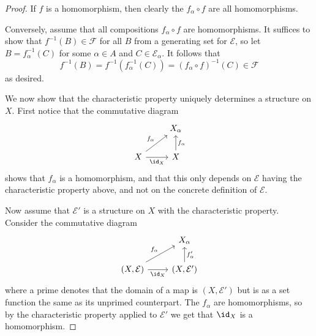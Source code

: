 \documentclass[article, a4paper, 11pt, oneside]{memoir}
\numberwithin{equation}{chapter}
\newcommand{\calE}{\mathcal{E}}
\newcommand{\calF}{\mathcal{F}}
\newcommand{\preim}{^{-1}}
\begin{document}
\begin{proof}
    If $f$ is a homomorphism, then clearly the $f_\alpha \circ f$ are all homomorphisms.

    Conversely, assume that all compositions $f_\alpha \circ f$ are homomorphisms. It suffices to show that $f\preim(B) \in \calF$ for all $B$ from a generating set for $\calE$, so let $B = f_\alpha\preim(C)$ for some $\alpha \in A$ and $C \in \calE_\alpha$. It follows that
    \begin{equation*}
        f\preim(B)
            = f\preim(f_\alpha\preim(C))
            = (f_\alpha \circ f)\preim(C)
            \in \calF
    \end{equation*}
    as desired.
    
    We now show that the characteristic property uniquely determines a structure on $X$. First notice that the commutative diagram
    \begin{equation*}
        \begin{tikzcd}
            & X_\alpha \\
            X
                \ar[r, "\id_X", swap]
                \ar[ur, "f_\alpha"]
            & X
                \ar[u, "f_\alpha", swap]
        \end{tikzcd}
    \end{equation*}
    shows that $f_\alpha$ is a homomorphism, and that this only depends on $\calE$ having the characteristic property above, and not on the concrete definition of $\calE$.

    Now assume that $\calE'$ is a structure on $X$ with the characteristic property. Consider the commutative diagram
    \begin{equation*}
        \begin{tikzcd}
            & X_\alpha \\
            (X, \calE)
                \ar[r, "\id_X", swap]
                \ar[ur, "f_\alpha"]
            & (X, \calE')
                \ar[u, "f_\alpha'", swap]
        \end{tikzcd}
    \end{equation*}
    where a prime denotes that the domain of a map is $(X,\calE')$ but is as a set function the same as its unprimed counterpart. The $f_\alpha$ are homomorphisms, so by the characteristic property applied to $\calE'$ we get that $\id_X$ is a homomorphism.


\end{proof}
\end{document}
